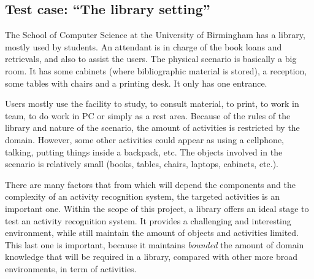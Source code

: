 

\subsection{Test case: ``The library setting''} \label{sec_Library} %

The School of Computer Science at the University of Birmingham has a library, mostly used by students.
An attendant is in charge of the book loans and retrievals, and also to assist the users.
The physical scenario is basically a big room. It has some cabinets (where bibliographic material is stored), a reception, some tables with chairs and a printing desk. It only has one entrance.

Users mostly use the facility to study, to consult material, to print, to work in team, to do work in PC or simply as a rest area.
Because of the rules of the library and nature of the scenario, the amount of activities is restricted by the domain.
However, some other activities could appear as using a cellphone, talking, putting things inside a backpack, etc.
The objects involved in the scenario is relatively small (books, tables, chairs, laptops, cabinets, etc.).

There are many factors that from which will depend the components and the complexity of an activity recognition system, the targeted activities is an important one.
Within the scope of this project, a library offers an ideal stage to test an activity recognition system.
It provides a challenging and interesting environment, while still maintain the amount of objects and activities limited.
This last one is important, because it maintains \textit{bounded} the amount of domain knowledge that will be required in a library, compared with other more broad environments, in term of activities.







